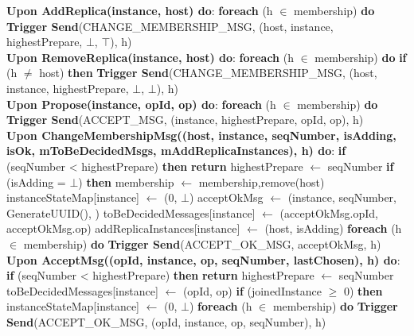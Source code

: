 \documentclass[sigconf]{acmart}
\begin{document}
\begin{algorithmic}[1]
\State \textbf{Upon AddReplica(instance, host) do}:
\State \quad \textbf{foreach} (h $\in$ membership) \textbf{do}
\State \quad \quad \textbf{Trigger Send}(CHANGE\_MEMBERSHIP\_MSG, (host, instance, highestPrepare, $\bot$, $\top$), h) \\

\State \textbf{Upon RemoveReplica(instance, host) do}:
\State \quad \textbf{foreach} (h $\in$ membership) \textbf{do}
\State \quad \quad \textbf{if} (h $\neq$ host) \textbf{then}
\State \quad \quad \quad \textbf{Trigger Send}(CHANGE\_MEMBERSHIP\_MSG, (host, instance, highestPrepare, $\bot$, $\bot$), h) \\

\State \textbf{Upon Propose(instance, opId, op) do}:
\State \quad \textbf{foreach} (h $\in$ membership) \textbf{do}
\State \quad \quad \textbf{Trigger Send}(ACCEPT\_MSG, (instance, highestPrepare, opId, op), h) \\

\State \textbf{Upon ChangeMembershipMsg((host, instance, seqNumber, isAdding, isOk, mToBeDecidedMsgs, mAddReplicaInstances), h) do}:
\State \quad \textbf{if} (seqNumber < highestPrepare) \textbf{then}
\State \quad \quad \textbf{return}
\State \quad highestPrepare $\gets$ seqNumber
\State \quad \textbf{if} (isAdding = $\bot$) \textbf{then}
\State \quad \quad membership $\gets$ membership,remove(host)
\State \quad instanceStateMap[instance] $\gets$ (0, $\bot$)
\State \quad acceptOkMsg $\gets$ (instance, seqNumber, GenerateUUID(), {})
\State \quad toBeDecidedMessages[instance] $\gets$ (acceptOkMsg.opId, acceptOkMsg.op)
\State \quad addReplicaInstances[instance] $\gets$ (host, isAdding)
\State \quad \textbf{foreach} (h $\in$ membership) \textbf{do}
\State \quad \quad \textbf{Trigger Send}(ACCEPT\_OK\_MSG, acceptOkMsg, h) \\

\State \textbf{Upon AcceptMsg((opId, instance, op, seqNumber, lastChosen), h) do}:
\State \quad \textbf{if} (seqNumber < highestPrepare) \textbf{then}
\State \quad \quad \textbf{return}
\State \quad highestPrepare $\gets$ seqNumber
\State \quad toBeDecidedMessages[instance] $\gets$ (opId, op)
\State \quad \textbf{if} (joinedInstance $\ge$ 0) \textbf{then}
\State \quad \quad instanceStateMap[instance] $\gets$ (0, $\bot$)
\State \quad \quad \textbf{foreach} (h $\in$ membership) \textbf{do}
\State \quad \quad \quad \textbf{Trigger Send}(ACCEPT\_OK\_MSG, (opId, instance, op, seqNumber), h) \\


\end{algorithmic}
\end{document}
